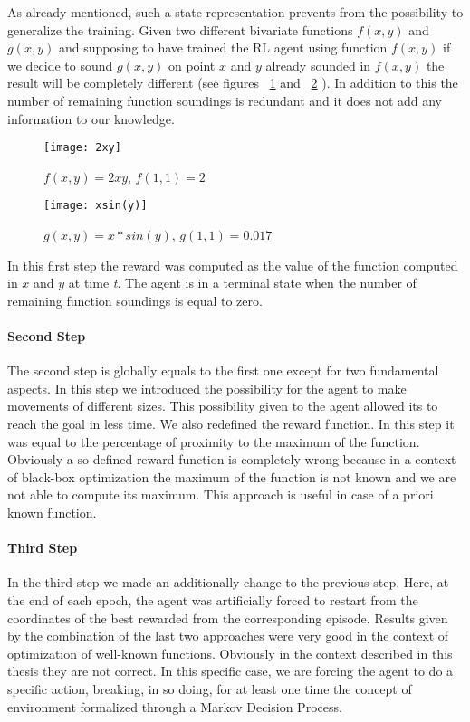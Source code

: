 As already mentioned, such a state representation prevents from the possibility to generalize the training. Given two different bivariate functions $f(x, y)$ and $g(x, y)$ and supposing to have trained the RL agent using function $f(x, y)$ if we decide to sound $g(x, y)$ on point $x$ and $y$ already sounded in $f(x, y)$ the result will be completely different (see figures ~\ref{fig:2xy} and ~\ref{fig:xsin(y)} ). In addition to this the number of remaining function soundings is redundant and it does not add any information to our knowledge.

\begin{figure} [h!]
	\centering
	\texttt{[image: 2xy]}
	\caption{$f(x, y) = 2xy$, \quad $f(1, 1) = 2$}
	\label{fig:2xy}
\end{figure}

\begin{figure} [h!]
	\centering
	\texttt{[image: xsin(y)]}
	\caption{$g(x, y) = x*sin(y)$, \quad $g(1, 1) = 0.017$}
	\label{fig:xsin(y)}
\end{figure} 

In this first step the reward was computed as the value of the function computed in $x$ and $y$ at time \textit{t}. The agent is in a terminal state when the number of remaining function soundings is equal to zero.

\paragraph{Second Step} The second step is globally equals to the first one except for two fundamental aspects. In this step we introduced the possibility for the agent to make movements of different sizes. This possibility given to the agent allowed its to reach the goal in less time. We also redefined the reward function. In this step it was equal to the percentage of proximity to the maximum of the function. Obviously a so defined reward function is completely wrong because in a context of black-box optimization the maximum of the function is not known and we are not able to compute its maximum. This approach is useful in case of a priori known function.

\paragraph{Third Step} In the third step we made an additionally change to the previous step. Here, at the end of each epoch, the agent was artificially forced to restart from the coordinates of the best rewarded from the corresponding episode. Results given by the combination of the last two approaches were very good in the context of optimization of well-known functions. Obviously in the context described in this thesis they are not correct. In this specific case, we are forcing the agent to do a specific action, breaking, in so doing, for at least one time the concept of environment formalized through a Markov Decision Process.

